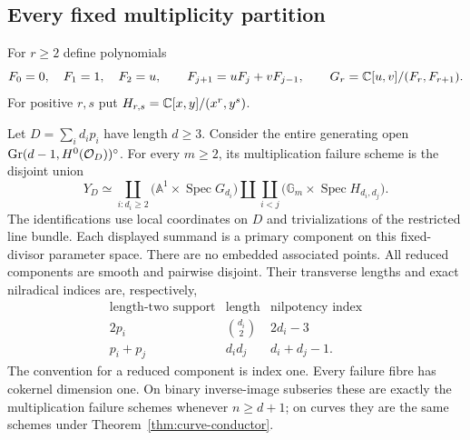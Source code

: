 \subsection{Every fixed multiplicity partition}
For $r\ge2$ define polynomials
\begin{equation}\label{eq:grass-recurrence}
 F_0=0,\quad F_1=1,\quad F_2=u,\qquad
 F_{j+1}=uF_j+vF_{j-1},\qquad
 G_r=\mathbb C[u,v]/(F_r,F_{r+1}).
\end{equation}
For positive $r,s$ put $H_{r,s}=\mathbb C[x,y]/(x^r,y^s)$.

\begin{theorem}
\label{thm:contact-hyperplane-primary}
Let $D=\sum_i d_i p_i$ have length $d\ge3$. Consider the entire
generating open $\operatorname{Gr}(d-1,H^0(\mathcal O_D))^\circ$.
For every $m\ge2$, its multiplication failure scheme is the disjoint
union
\begin{equation}\label{eq:hyperplane-primary-disjoint}
 Y_D\simeq
 \coprod_{i:d_i\ge2}\bigl(\mathbb A^1\times\operatorname{Spec}G_{d_i}\bigr)
 \amalg\coprod_{i<j}\bigl(\mathbb G_m\times\operatorname{Spec}H_{d_i,d_j}\bigr).
\end{equation}
The identifications use local coordinates on $D$ and trivializations
of the restricted line bundle. Each displayed summand is a primary
component on this fixed-divisor parameter space. There are no
embedded associated points. All reduced components are smooth and
pairwise disjoint. Their transverse lengths and exact nilradical
indices are, respectively,
\[
 \begin{array}{c|c|c}
 \text{length-two support}&\text{length}&\text{nilpotency index}\\ \hline
 2p_i&\binom{d_i}{2}&2d_i-3\\
 p_i+p_j&d_i d_j&d_i+d_j-1.
 \end{array}
\]
The convention for a reduced component is index one. Every failure
fibre has cokernel dimension one. On binary inverse-image subseries
these are exactly the multiplication failure schemes whenever
$n\ge d+1$; on curves they are the same schemes under
Theorem~\ref{thm:curve-conductor}.
\end{theorem}
